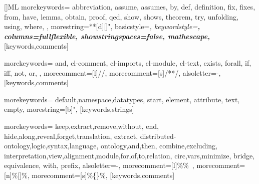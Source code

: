 \RequirePackage{listings}
% 
% 
% 
% 

[]{ML}%
{morekeywords={%
abbreviation,%
assume,%
assumes,%
by,%
def,%
definition,%
fix,%
fixes,%
from,%
have,%
lemma,%
obtain,%
proof,%
qed,%
show,%
shows,%
theorem,%
try,%
unfolding,%
using,%
where,%
},
morestring=**[d][\color{IsabelleStringBackground}]{"},
basicstyle=\itshape,%
keywordstyle=\upshape\bfseries,%
columns=fullflexible,%
showstringspaces=false,%
mathescape,%
}[keywords,comments]

%
{morekeywords={%
and,%
cl-comment,%
cl-imports,%
cl-module,%
cl-text,%
exists,%
forall,%
if,%
iff,%
not,%
or,%
},
morecomment=[l]{//},%
morecomment=[s]{/*}{*/},%
alsoletter=-,%
}[keywords,comments]

%
{morekeywords={%
default,namespace,datatypes,%
start,%
element,%
attribute,%
text,%
empty},
morestring=[b]",%
}[keywords,strings]

%
{morekeywords={%
keep,extract,remove,without,%
end,%
hide,along,reveal,forget,translation,%
extract,%
distributed-ontology,logic,syntax,language,%
ontology,and,then,%
combine,excluding,%
interpretation,view,alignment,module,for,of,to,relation,%
circ,vars,minimize,%
bridge,%
equivalence,%
with,%
prefix},
alsoletter=-,%
morecomment=[l]{\%\%\ },%
morecomment=[n]{\%[}{]\%},%
morecomment=[s]{\%\{}{\}\%},%
}[keywords,comments]

